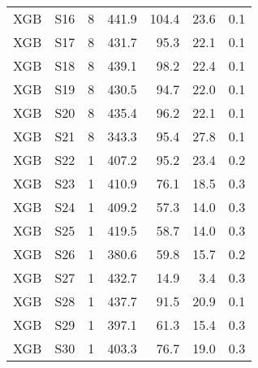 \begin{table}
\begin{tabular}{rrrrrrr}
  XGB &  S16 &             8 &   441.9 & 104.4 &         23.6 &    0.1 \\
  XGB &  S17 &             8 &   431.7 &  95.3 &         22.1 &    0.1 \\
  XGB &  S18 &             8 &   439.1 &  98.2 &         22.4 &    0.1 \\
  XGB &  S19 &             8 &   430.5 &  94.7 &         22.0 &    0.1 \\
  XGB &  S20 &             8 &   435.4 &  96.2 &         22.1 &    0.1 \\
  XGB &  S21 &             8 &   343.3 &  95.4 &         27.8 &    0.1 \\
  XGB &  S22 &             1 &   407.2 &  95.2 &         23.4 &    0.2 \\
  XGB &  S23 &             1 &   410.9 &  76.1 &         18.5 &    0.3 \\
  XGB &  S24 &             1 &   409.2 &  57.3 &         14.0 &    0.3 \\
  XGB &  S25 &             1 &   419.5 &  58.7 &         14.0 &    0.3 \\
  XGB &  S26 &             1 &   380.6 &  59.8 &         15.7 &    0.2 \\
  XGB &  S27 &             1 &   432.7 &  14.9 &          3.4 &    0.3 \\
  XGB &  S28 &             1 &   437.7 &  91.5 &         20.9 &    0.1 \\
  XGB &  S29 &             1 &   397.1 &  61.3 &         15.4 &    0.3 \\
  XGB &  S30 &             1 &   403.3 &  76.7 &         19.0 &    0.3 \\
\bottomrule
\end{tabular}
\end{table}
